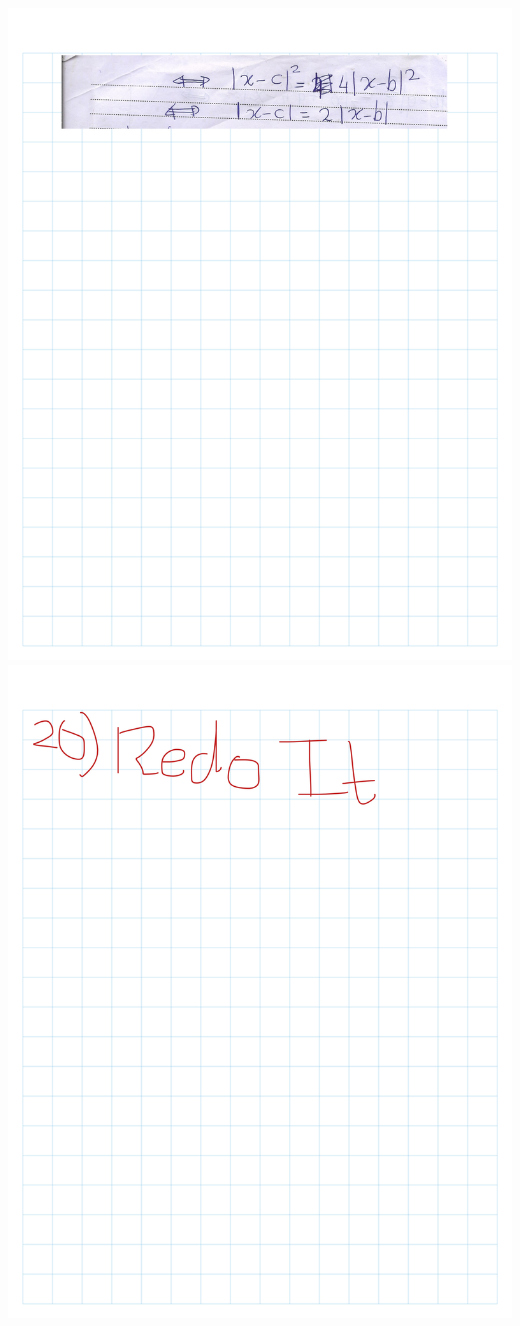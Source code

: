 \documentclass[
]{book}
\theoremstyle{definition}
\theoremstyle{definition}
\theoremstyle{definition}
\theoremstyle{definition}
\theoremstyle{remark}
\begin{document}
\includegraphics{Figures/Ex-1/Rudin-Ex (34).png}
\includegraphics{Figures/Ex-1/Rudin-Ex (35).png}
\end{document}
